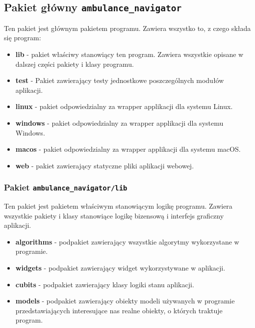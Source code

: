 \documentclass{article}
\begin{document}
\subsection{Pakiet główny \texttt{ambulance\_navigator}}
Ten pakiet jest głównym pakietem programu. Zawiera wszystko to, z czego składa się program:
\begin{itemize}
\item \textbf{lib} - pakiet właściwy stanowiący ten program. Zawiera wszystkie opisane w dalszej części pakiety i klasy programu.
\item \textbf{test} - Pakiet zawierający testy jednostkowe poszczególnych modułów aplikacji.
\item \textbf{linux} - pakiet odpowiedzialny za wrapper applikacji dla systemu Linux.
\item \textbf{windows} - pakiet odpowiedzialny za wrapper applikacji dla systemu Windows.
\item \textbf{macos} - pakiet odpowiedzialny za wrapper applikacji dla systemu macOS.
\item \textbf{web} - pakiet zawierający statyczne pliki aplikacji webowej.
\end{itemize}

\subsubsection{Pakiet \texttt{ambulance\_navigator/lib}}
Ten pakiet jest pakietem właściwym stanowiącym logikę programu. Zawiera wszystkie pakiety i klasy stanowiące logikę bizensową i interfejs graficzny aplikacji.
\begin{itemize}
\item \textbf{algorithms} - podpakiet zawierający wszystkie algorytmy wykorzystane w programie.
\item \textbf{widgets} - podpakiet zawierający widget wykorzystywane w aplikacji.
\item \textbf{cubits} - podpakiet zawierający klasy logiki stanu aplikacji.
\item \textbf{models} - podpakiet zawierający obiekty modeli używanych w programie przedstawiających interesujące nas realne obiekty, o których traktuje program.
\end{itemize}
\end{document}

